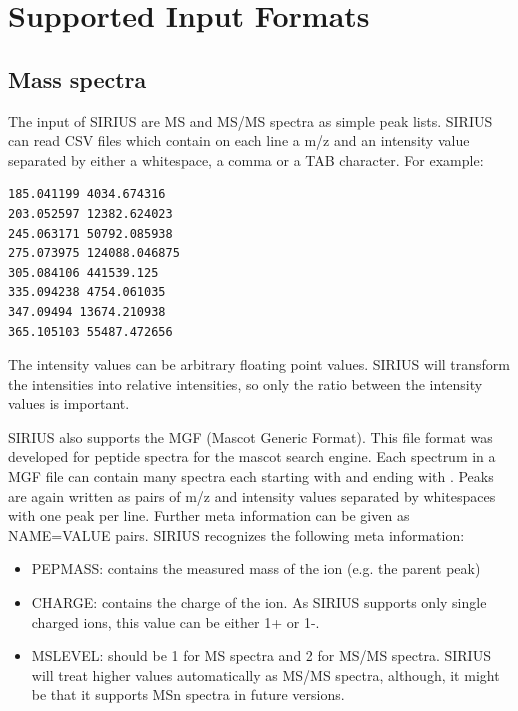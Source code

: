 \documentclass[letterpaper,10pt,openany,oneside]{sphinxmanual}
\begin{document}

\section{Supported Input Formats}
\label{commandline:inputformats}\label{commandline:supported-input-formats}

\subsection{Mass spectra}
\label{commandline:mass-spectra}
The input of SIRIUS are MS and MS/MS spectra as simple peak lists. SIRIUS can read CSV files which contain on each line a m/z and an intensity value separated by either a whitespace, a comma or a TAB character. For example:

\begin{Verbatim}[commandchars=\\\{\}]
185.041199 4034.674316
203.052597 12382.624023
245.063171 50792.085938
275.073975 124088.046875
305.084106 441539.125
335.094238 4754.061035
347.09494 13674.210938
365.105103 55487.472656
\end{Verbatim}

The intensity values can be arbitrary floating point values. SIRIUS will transform the intensities into relative intensities, so only the ratio between the intensity values is important.

SIRIUS also supports the MGF (Mascot Generic Format). This file format was developed for peptide spectra for the mascot search engine. Each spectrum in a MGF file can contain many spectra each starting with  and ending with . Peaks are again written as pairs of m/z and intensity values separated by whitespaces with one peak per line. Further meta information can be given as NAME=VALUE pairs. SIRIUS recognizes the following meta information:
\begin{itemize}
\item {} 
PEPMASS: contains the measured mass of the ion (e.g. the parent peak)

\item {} 
CHARGE: contains the charge of the ion. As SIRIUS supports only single charged ions, this value can be either 1+ or 1-.

\item {} 
MSLEVEL: should be 1 for MS spectra and 2 for MS/MS spectra. SIRIUS will treat higher values automatically as MS/MS spectra, although, it might be that it supports MSn spectra in future versions.

\end{itemize}
\end{document}
